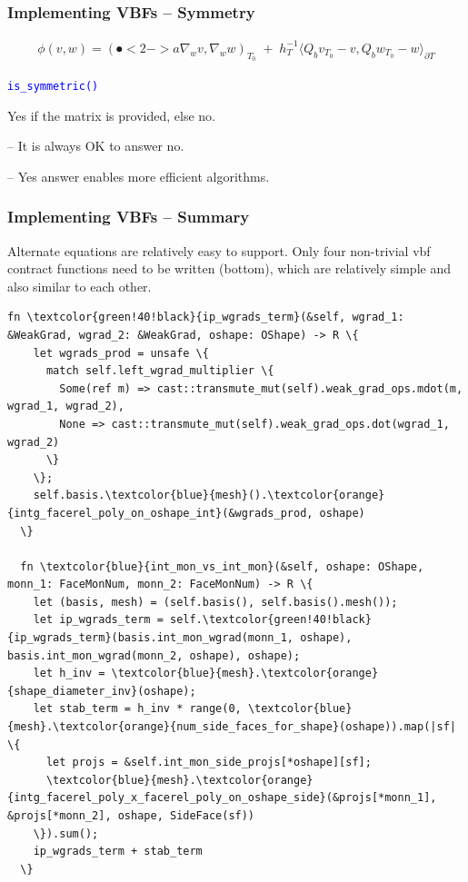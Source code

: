 \documentclass[compress]{beamer}
\begin{document}
\begin{frame}
  \frametitle{Implementing VBFs -- Symmetry}
  \begin{align*}
    \mathfrak \phi(v,w) = (\spot<2->{a} \nabla_w v,\nabla_w w)_{\scriptscriptstyle T_0} \;+\;
    h_T^{-1}\langle Q_b v_{\scriptscriptstyle T_0} - v,Q_b w_{\scriptscriptstyle T_0} - w \rangle_{\partial T}
  \end{align*}
  
  \texttt{\small \textcolor{blue}{is\_symmetric()}}\\
 
  \pause
  \uncover<+-> {
  \vspace{0.5cm}
  Yes if the matrix  is provided, else no.
 
  \uncover<+-> {
  \vspace{0.3cm}
  -- It is always OK to answer no.
  
  \uncover<+-> {
  \vspace{0.3cm}
  -- Yes answer enables more efficient algorithms.
  }}}
\end{frame}

\begin{frame}[fragile]
  \frametitle{Implementing VBFs -- Summary}
  \uncover<+-> {
  Alternate equations are relatively easy to support. Only four non-trivial vbf contract functions need to be written (bottom),
  which are relatively simple and also similar to each other.\\
  }
  \begin{Verbatim}[gobble=2, commandchars=\\\{\}, fontsize=\tiny, fontfamily=tt]
  fn \textcolor{green!40!black}{ip_wgrads_term}(&self, wgrad_1: &WeakGrad, wgrad_2: &WeakGrad, oshape: OShape) -> R \{
    let wgrads_prod = unsafe \{
      match self.left_wgrad_multiplier \{
        Some(ref m) => cast::transmute_mut(self).weak_grad_ops.mdot(m, wgrad_1, wgrad_2),
        None => cast::transmute_mut(self).weak_grad_ops.dot(wgrad_1, wgrad_2)
      \}
    \};
    self.basis.\textcolor{blue}{mesh}().\textcolor{orange}{intg_facerel_poly_on_oshape_int}(&wgrads_prod, oshape)
  \}

  fn \textcolor{blue}{int_mon_vs_int_mon}(&self, oshape: OShape, monn_1: FaceMonNum, monn_2: FaceMonNum) -> R \{
    let (basis, mesh) = (self.basis(), self.basis().mesh());
    let ip_wgrads_term = self.\textcolor{green!40!black}{ip_wgrads_term}(basis.int_mon_wgrad(monn_1, oshape), basis.int_mon_wgrad(monn_2, oshape), oshape);
    let h_inv = \textcolor{blue}{mesh}.\textcolor{orange}{shape_diameter_inv}(oshape);
    let stab_term = h_inv * range(0, \textcolor{blue}{mesh}.\textcolor{orange}{num_side_faces_for_shape}(oshape)).map(|sf| \{
      let projs = &self.int_mon_side_projs[*oshape][sf];
      \textcolor{blue}{mesh}.\textcolor{orange}{intg_facerel_poly_x_facerel_poly_on_oshape_side}(&projs[*monn_1], &projs[*monn_2], oshape, SideFace(sf))
    \}).sum();
    ip_wgrads_term + stab_term
  \}
  \end{Verbatim}
\end{frame}
\end{document}
